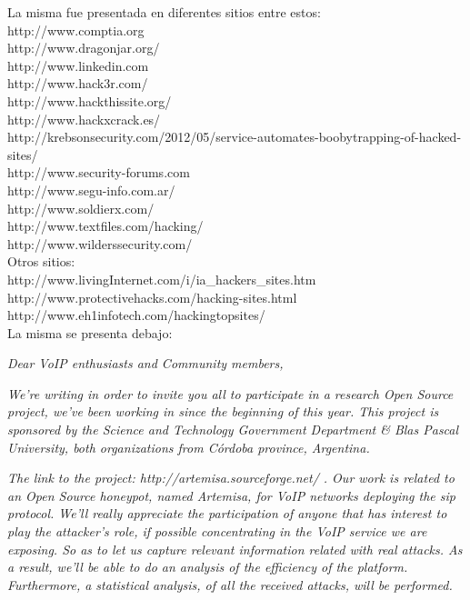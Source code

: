 \documentclass[a4paper,12pt]{report}
\begin{document}
La misma fue presentada en diferentes sitios entre estos:\\
http://www.comptia.org\\
http://www.dragonjar.org/\\
http://www.linkedin.com\\
http://www.hack3r.com/\\
http://www.hackthissite.org/\\
http://www.hackxcrack.es/\\
http://krebsonsecurity.com/2012/05/service-automates-boobytrapping-of-hacked-sites/\\
http://www.security-forums.com\\
http://www.segu-info.com.ar/\\
http://www.soldierx.com/\\
http://www.textfiles.com/hacking/\\
http://www.wilderssecurity.com/\\

Otros sitios:\\
http://www.livingInternet.com/i/ia\_hackers\_sites.htm\\
http://www.protectivehacks.com/hacking-sites.html\\
http://www.eh1infotech.com/hackingtopsites/\\

La misma se presenta debajo:

\emph{Dear VoIP enthusiasts and Community members,\\}

\emph{We're writing in order to invite you all to participate in a research
Open Source project, we've been working in since the beginning of this year.
This project is sponsored by the Science and Technology Government Department \&
Blas Pascal University, both organizations from Córdoba province,
Argentina.\\}

\emph{The link to the project: http://artemisa.sourceforge.net/ . Our work is
related to an Open Source honeypot, named Artemisa, for VoIP networks deploying
the \ac{sip} protocol. We'll really appreciate the participation of anyone that has
interest to play the attacker's role, if possible concentrating in the VoIP
service we are exposing. So as to let us capture relevant information related
with real attacks. As a result, we'll be able to do an analysis of the
efficiency of the platform. Furthermore, a statistical analysis, of all the
received attacks, will be performed.\\}
\end{document}
